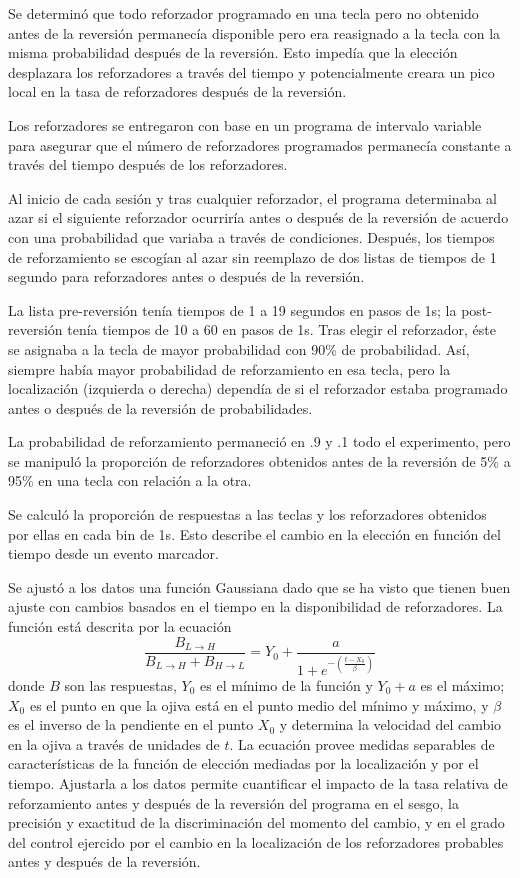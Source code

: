 \documentclass[a4paper,12pt]{article}
\begin{document}
Se determinó que todo reforzador programado en una tecla pero no obtenido antes de la reversión permanecía disponible pero era reasignado a la tecla con la misma probabilidad después de la reversión. Esto impedía que la elección desplazara los reforzadores a través del tiempo y potencialmente creara un pico local en la tasa de reforzadores después de la reversión.

Los reforzadores se entregaron con base en un programa de intervalo variable para asegurar que el número de reforzadores programados permanecía constante a través del tiempo después de los reforzadores.

Al inicio de cada sesión y tras cualquier reforzador, el programa determinaba al azar si el siguiente reforzador ocurriría antes o después de la reversión de acuerdo con una probabilidad que variaba a través de condiciones. Después, los tiempos de reforzamiento se escogían al azar sin reemplazo de dos listas de tiempos de 1 segundo para reforzadores antes o después de la reversión.

La lista pre-reversión tenía tiempos de 1 a 19 segundos en pasos de 1s; la post-reversión tenía tiempos de 10 a 60 en pasos de 1s. Tras elegir el reforzador, éste se asignaba a la tecla de mayor probabilidad con 90\% de probabilidad. Así, siempre había mayor probabilidad de reforzamiento en esa tecla, pero la localización (izquierda o derecha) dependía de si el reforzador estaba programado antes o después de la reversión de probabilidades.

La probabilidad de reforzamiento permaneció en .9 y .1 todo el experimento, pero se manipuló la proporción de reforzadores obtenidos antes de la reversión de 5\% a 95\% en una tecla con relación a la otra.

Se calculó la proporción de respuestas a las teclas y los reforzadores obtenidos por ellas en cada bin de 1s. Esto describe el cambio en la elección en función del tiempo desde un evento marcador.

Se ajustó a los datos una función Gaussiana dado que se ha visto que tienen buen ajuste con cambios basados en el tiempo en la disponibilidad de reforzadores. La función está descrita por la ecuación
\[
\frac{
    B_{L\rightarrow H}
}{
    B_{L \rightarrow H} + B_{H \rightarrow L}
} = Y_0 + \frac{
    a
}{
    1 + e^{-\left(\frac{t - X_0}{\beta}\right)}
}
\]
donde $B$ son las respuestas, $Y_0$ es el mínimo de la función y $Y_0 + a$ es el máximo; $X_0$ es el punto en que la ojiva está en el punto medio del mínimo y máximo, y $\beta$ es el inverso de la pendiente en el punto $X_0$ y determina la velocidad del cambio en la ojiva a través de unidades de $t$. La ecuación provee medidas separables de características de la función de elección mediadas por la localización y por el tiempo. Ajustarla a los datos permite cuantificar el impacto de la tasa relativa de reforzamiento antes y después de la reversión del programa en el sesgo, la precisión y exactitud de la discriminación del momento del cambio, y en el grado del control ejercido por el cambio en la localización de los reforzadores probables antes y después de la reversión.
\end{document}
